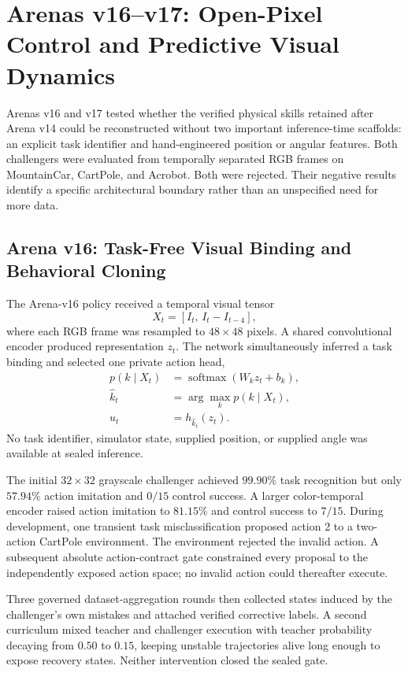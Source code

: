 \section{Arenas v16--v17: Open-Pixel Control and Predictive Visual Dynamics}
\label{sec:arenas-v16-v17-open-pixel}

Arenas v16 and v17 tested whether the verified physical skills retained after
Arena v14 could be reconstructed without two important inference-time
scaffolds: an explicit task identifier and hand-engineered position or angular
features.  Both challengers were evaluated from temporally separated RGB frames
on MountainCar, CartPole, and Acrobot.  Both were rejected.  Their negative
results identify a specific architectural boundary rather than an unspecified
need for more data.

\subsection{Arena v16: Task-Free Visual Binding and Behavioral Cloning}

The Arena-v16 policy received a temporal visual tensor
\begin{equation}
 X_t=\left[I_t,\,I_t-I_{t-4}\right],
\end{equation}
where each RGB frame was resampled to $48\times48$ pixels.  A shared convolutional
encoder produced representation $z_t$.  The network simultaneously inferred a
task binding and selected one private action head,
\begin{align}
 p(k\mid X_t)&=\operatorname{softmax}(W_kz_t+b_k),\\
 \hat{k}_t&=\arg\max_k p(k\mid X_t),\\
 \hat{u}_t&=h_{\hat{k}_t}(z_t).
\end{align}
No task identifier, simulator state, supplied position, or supplied angle was
available at sealed inference.

The initial $32\times32$ grayscale challenger achieved $99.90\%$ task
recognition but only $57.94\%$ action imitation and $0/15$ control success.  A
larger color-temporal encoder raised action imitation to $81.15\%$ and control
success to $7/15$.  During development, one transient task misclassification
proposed action 2 to a two-action CartPole environment.  The environment rejected
the invalid action.  A subsequent absolute action-contract gate constrained
every proposal to the independently exposed action space; no invalid action
could thereafter execute.

Three governed dataset-aggregation rounds then collected states induced by the
challenger's own mistakes and attached verified corrective labels.  A second
curriculum mixed teacher and challenger execution with teacher probability
decaying from $0.50$ to $0.15$, keeping unstable trajectories alive long enough
to expose recovery states.  Neither intervention closed the sealed gate.

